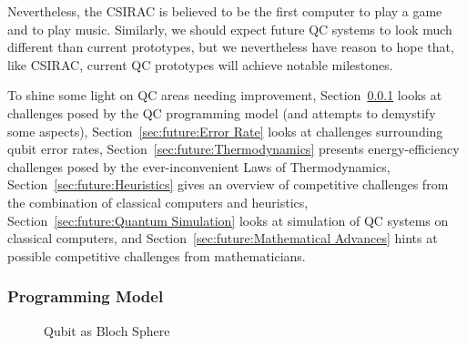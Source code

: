 Nevertheless, the CSIRAC is believed to be the first computer to
play a game and to play music.
Similarly, we should expect future QC systems to look much different
than current prototypes, but we nevertheless have reason to hope that,
like CSIRAC, current QC prototypes will achieve notable milestones.

To shine some light on QC areas needing improvement,
Section~\ref{sec:future:Programming Model} looks at challenges posed by the QC
programming model (and attempts to demystify some aspects),
Section~\ref{sec:future:Error Rate} looks at challenges surrounding qubit
error rates,
Section~\ref{sec:future:Thermodynamics} presents energy-efficiency challenges
posed by the ever-inconvenient Laws of Thermodynamics,
Section~\ref{sec:future:Heuristics} gives an overview of competitive
challenges from the combination of classical computers and heuristics,
Section~\ref{sec:future:Quantum Simulation} looks at simulation of QC
systems on classical computers,
and
Section~\ref{sec:future:Mathematical Advances} hints at possible competitive
challenges from mathematicians.
\fi

\subsubsection{Programming Model}
\label{sec:future:Programming Model}

\begin{figure}[tb]
\centering
{}
\caption{Qubit as Bloch Sphere}
\label{fig:future:Qubit as Bloch Sphere}
\end{figure}

